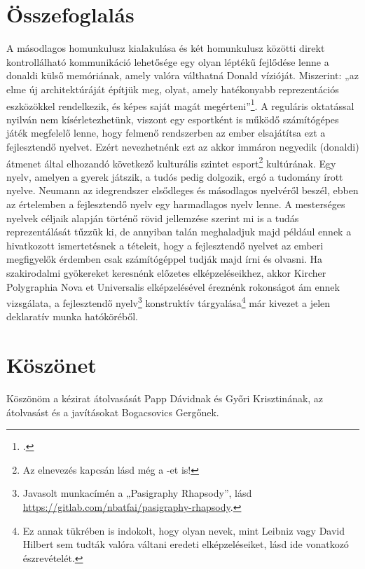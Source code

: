 \documentclass[a4paper]{article}
\begin{document}
\section{Összefoglalás}

A másodlagos homunkulusz kialakulása és két homunkulusz közötti direkt kontrollálható kommunikáció lehetősége egy olyan léptékű fejlődése lenne a donaldi külső memóriának, amely valóra válthatná Donald vízióját. Miszerint: „az elme új architektúráját építjük meg, olyat, amely hatékonyabb reprezentációs eszközökkel rendelkezik, és képes saját magát megérteni”\footnote{\cite[328]{Donald01}.}. A reguláris oktatással nyilván nem kísérletezhetünk, viszont egy esportként is működő szá\-mí\-tó\-gé\-pes játék megfelelő lenne, hogy felmenő rendszerben az ember elsajátítsa ezt a fejlesztendő nyelvet. Ezért nevezhetnénk ezt az akkor immáron negyedik (donaldi) átmenet által elhozandó következő kulturális szintet esport\footnote{Az elnevezés kapcsán lásd még a \cite{SMNIST}-et is!} kultúrának. Egy nyelv, amelyen a gyerek játszik, a tudós pedig dolgozik, ergó a tudomány írott nyelve. Neumann \cite{Neumann72} az idegrendszer elsődleges és másodlagos nyelvéről beszél, ebben az értelemben a fejlesztendő nyelv egy harmadlagos nyelv lenne. A mesterséges nyelvek céljaik alapján történő \cite[122]{Lang15} rövid jellemzése szerint mi is a tudás reprezentálását tűzzük ki, de annyiban talán meghaladjuk majd például ennek a hivatkozott ismertetésnek a tételeit, hogy a fejlesztendő nyelvet az emberi megfigyelők érdemben csak számítógéppel tudják majd írni és olvasni. Ha szakirodalmi gyökereket keresnénk előzetes elképzeléseikhez, akkor Kircher Polygraphia Nova et Universalis elképzelésével éreznénk rokonságot \cite[119]{Lang15} ám ennek vizsgálata, a fejlesztendő nyelv\footnote{Javasolt munkacímén a „Pasigraphy Rhapsody”, lásd \url{https://gitlab.com/nbatfai/pasigraphy-rhapsody}.} konstruktív tárgyalása\footnote{Ez annak tükrében is indokolt, hogy olyan nevek, mint Leibniz vagy David Hilbert sem tudták valóra váltani eredeti elképzeléseiket, lásd \cite[38]{Omega} ide vonatkozó észrevételét.} már kivezet a jelen deklaratív munka hatóköréből.

\section{Köszönet}

Köszönöm a kézirat átolvasását Papp Dávidnak és Győri Krisztinának, az át\-ol\-va\-sást és a javításokat Bogacsovics Gergőnek.



\end{document}
